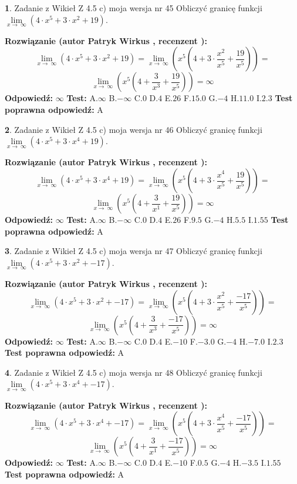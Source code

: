 \documentclass[12pt, a4paper]{article}
\theoremstyle{definition} %
\newtheorem{zad}{}
\newcommand{\zadStart}[1]{\begin{zad}#1\newline}
\newcommand{\zadStop}{\end{zad}}
\newcommand{\rozwStart}[2]{\noindent \textbf{Rozwiązanie (autor #1 , recenzent #2): }\newline}
\newcommand{\rozwStop}{\newline}
\newcommand{\odpStart}{\noindent \textbf{Odpowiedź:}\newline}
\newcommand{\odpStop}{\newline}
\newcommand{\testStart}{\noindent \textbf{Test:}\newline}
\newcommand{\testStop}{\newline}
\newcommand{\kluczStart}{\noindent \textbf{Test poprawna odpowiedź:}\newline}
\newcommand{\kluczStop}{\newline}
\begin{document}
\zadStart{Zadanie z Wikieł Z 4.5 c) moja wersja nr 45}
Obliczyć granicę funkcji  $\lim\limits_{x\to\ \infty}(4 \cdot x^{5}+3 \cdot x^{2}+19)$.
\zadStop
\rozwStart{Patryk Wirkus}{}
$$\lim\limits_{x\to\ \infty}(4 \cdot x^{5}+3 \cdot x^{2}+19) = \lim\limits_{x\to\ \infty}(x^{5}(4 +3 \cdot \frac{x^{2}}{x^{5}}+\frac{19}{x^{5}})) =$$ $$\lim\limits_{x\to\ \infty}(x^{5}(4 +\frac{3}{x^{3}}+\frac{19}{x^{5}})) =\infty$$
\rozwStop
\odpStart
$\infty$
\odpStop
\testStart
A.$\infty$ B.$-\infty$ C.$0$ D.$4$ E.$26$
F.$15.0$ G.$-4$
H.$11.0$
I.$2.3$
\testStop
\kluczStart
A
\kluczStop



\zadStart{Zadanie z Wikieł Z 4.5 c) moja wersja nr 46}
Obliczyć granicę funkcji  $\lim\limits_{x\to\ \infty}(4 \cdot x^{5}+3 \cdot x^{4}+19)$.
\zadStop
\rozwStart{Patryk Wirkus}{}
$$\lim\limits_{x\to\ \infty}(4 \cdot x^{5}+3 \cdot x^{4}+19) = \lim\limits_{x\to\ \infty}(x^{5}(4 +3 \cdot \frac{x^{4}}{x^{5}}+\frac{19}{x^{5}})) =$$ $$\lim\limits_{x\to\ \infty}(x^{5}(4 +\frac{3}{x^{1}}+\frac{19}{x^{5}})) =\infty$$
\rozwStop
\odpStart
$\infty$
\odpStop
\testStart
A.$\infty$ B.$-\infty$ C.$0$ D.$4$ E.$26$
F.$9.5$ G.$-4$
H.$5.5$
I.$1.55$
\testStop
\kluczStart
A
\kluczStop



\zadStart{Zadanie z Wikieł Z 4.5 c) moja wersja nr 47}
Obliczyć granicę funkcji  $\lim\limits_{x\to\ \infty}(4 \cdot x^{5}+3 \cdot x^{2}+-17)$.
\zadStop
\rozwStart{Patryk Wirkus}{}
$$\lim\limits_{x\to\ \infty}(4 \cdot x^{5}+3 \cdot x^{2}+-17) = \lim\limits_{x\to\ \infty}(x^{5}(4 +3 \cdot \frac{x^{2}}{x^{5}}+\frac{-17}{x^{5}})) =$$ $$\lim\limits_{x\to\ \infty}(x^{5}(4 +\frac{3}{x^{3}}+\frac{-17}{x^{5}})) =\infty$$
\rozwStop
\odpStart
$\infty$
\odpStop
\testStart
A.$\infty$ B.$-\infty$ C.$0$ D.$4$ E.$-10$
F.$-3.0$ G.$-4$
H.$-7.0$
I.$2.3$
\testStop
\kluczStart
A
\kluczStop



\zadStart{Zadanie z Wikieł Z 4.5 c) moja wersja nr 48}
Obliczyć granicę funkcji  $\lim\limits_{x\to\ \infty}(4 \cdot x^{5}+3 \cdot x^{4}+-17)$.
\zadStop
\rozwStart{Patryk Wirkus}{}
$$\lim\limits_{x\to\ \infty}(4 \cdot x^{5}+3 \cdot x^{4}+-17) = \lim\limits_{x\to\ \infty}(x^{5}(4 +3 \cdot \frac{x^{4}}{x^{5}}+\frac{-17}{x^{5}})) =$$ $$\lim\limits_{x\to\ \infty}(x^{5}(4 +\frac{3}{x^{1}}+\frac{-17}{x^{5}})) =\infty$$
\rozwStop
\odpStart
$\infty$
\odpStop
\testStart
A.$\infty$ B.$-\infty$ C.$0$ D.$4$ E.$-10$
F.$0.5$ G.$-4$
H.$-3.5$
I.$1.55$
\testStop
\kluczStart
A
\kluczStop
\end{document}
